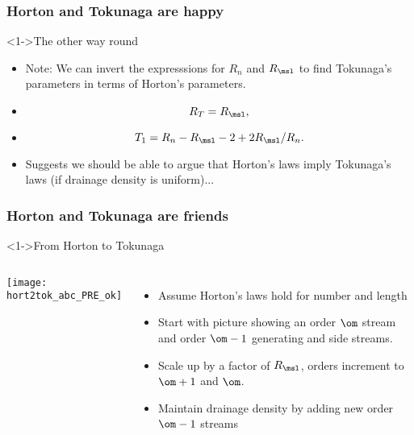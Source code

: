 \begin{frame}[label=]
  \frametitle{Horton and Tokunaga are happy}
  
  \begin{block}<1->{The other way round}
    \begin{itemize}
    \item<1-> Note: We can invert the expresssions
      for $R_n$ and $R_\msl$ to find Tokunaga's
      parameters in terms of Horton's parameters.
    \item<2-> 
      $$
      R_T = R_\msl,
      $$
    \item<2->
      $$
      T_1  =  R_n - R_\msl - 2 + 2R_\msl/R_n.
      $$
    \item<3-> 
      Suggests we should be able to argue that Horton's laws
      imply Tokunaga's laws (if drainage density is uniform)...
    \end{itemize}
  \end{block}

\end{frame}

\begin{frame}[label=]
  \frametitle{Horton and Tokunaga are friends}

  \begin{block}<1->{From Horton to Tokunaga\cite{dodds1999a}}
    \begin{columns}
      \texttt{[image: hort2tok\_abc\_PRE\_ok]}
      \begin{itemize}
      \item<2-> Assume Horton's laws hold for number and length
      \item<3-> Start with picture showing an order $\om$ stream
        and order $\om-1$ generating and side streams.
      \item<4-> Scale up by a factor of $R_\msl$, orders increment
        to $\om+1$ and $\om$.
      \item<5-> Maintain drainage density by adding new order $\om-1$ streams
      \end{itemize}
    \end{columns}
      
  \end{block}

\end{frame}

